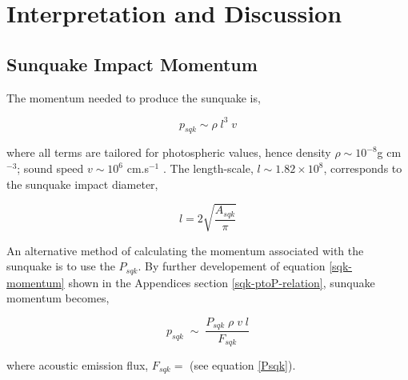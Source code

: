 \section{Interpretation and Discussion}
\subsection{Sunquake Impact Momentum}
The momentum needed to produce the sunquake is,

\begin{equation}
p_{sqk}\sim \rho \; l^{3} \; v
\end{equation}\label{sqk-momentum} 

where all terms are tailored for photospheric values, hence density $\rho \sim 10^{-8}$g cm$^{-3}$; sound speed $v \sim 10^{6}$ cm.s$^{-1}$ \citep{2015ApJ...807..102S}. The length-scale, $l \sim  1.82{\times}10^{8}$, corresponds to the sunquake impact diameter, 

\begin{equation}
l = 2\sqrt{\frac{A_{sqk}}{\pi}}
\end{equation}\label{lengthscale}


An alternative method of calculating the momentum associated with the sunquake is to use the $P_{sqk}$. By further developement of equation \ref{sqk-momentum} shown in the Appendices section \ref{sqk-ptoP-relation}, sunquake momentum becomes,  

\begin{equation}
p_{sqk} \; \sim \; \frac{P_{sqk} \; \rho \; v \; l }{F_{sqk}}
\end{equation}\label{sqk-momentum-from-power}

where acoustic emission flux, $F_{sqk} = $ (see equation \ref{Psqk}).



